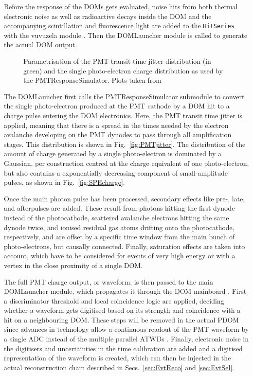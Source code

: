 Before the response of the DOMs gets evaluated, noise hits from both thermal
electronic noise as well as radioactive decays inside the DOM and the
accompanying scintillation and fluorescence light are added to the
\texttt{HitSeries} with the vuvuzela module \cite{vuvuzela}. Then the
DOMLauncher module \cite{DOMLauncher} is called to generate the actual DOM
output.

\begin{figure}
\centering
  \subfloat[\label{fig:SPEcharge}]
    {\texttt{[image: TA0003]}}
  \caption{Parametrisation of \protect{} the PMT transit
       time jitter distribution (in green) and \protect{}
       the single photo-electron charge distribution as used by the
       PMTResponseSimulator. Plots taken from \cite{PMTRes}}
\label{fig:PMTRes}
\end{figure}

The DOMLauncher first calls the PMTResponseSimulator submodule \cite{PMTRes} to
convert the single photo-electron produced at the PMT cathode by a DOM hit to a
charge pulse entering the DOM electronics. Here, the PMT transit time jitter is
applied, meaning that there is a spread in the times needed by the electron
avalanche developing on the PMT dynodes to pass through all amplification
stages. This distribution is shown in Fig.~\ref{fig:PMTjitter}. The
distribution of the amount of charge generated by a single photo-electron is
dominated by a Gaussian, per construction centred at the charge equivalent of
one photo-electron, but also contains a exponentially decreasing component of
small-amplitude pulses, as shown in Fig.~\ref{fig:SPEcharge}.

Once the main photon pulse has been processed, secondary effects like pre-,
late, and afterpulses are added. These result from photons hitting the first
dynode instead of the photocathode, scattered avalanche electrons hitting the
same dynode twice, and ionised residual gas atoms drifting onto the
photocathode, respectively, and are offset by a specific time window from the
main bunch of photo-electrons, but causally connected. Finally, saturation
effects are taken into account, which have to be considered for events of very
high energy or with a vertex in the close proximity of a single DOM.

The full PMT charge output, or waveform, is then passed to the main DOMLauncher
module, which propagates it through the DOM mainboard \cite{DOMLauncher}. First
a discriminator threshold and local coincidence logic are applied, deciding
whether a waveform gets digitised based on its strength and coincidence with a
hit on a neighbouring DOM. These steps will be removed in the actual PDOM since
advances in technology allow a continuous readout of the PMT waveform by a
single ADC instead of the multiple parallel ATWDs \cite{PDOM_Aachen}. Finally,
electronic noise in the digitisers and uncertainties in the time calibration are
added and a digitised representation of the waveform is created, which can then
be injected in the actual reconstruction chain described in
Secs.~\ref{sec:EvtReco} and \ref{sec:EvtSel}.

